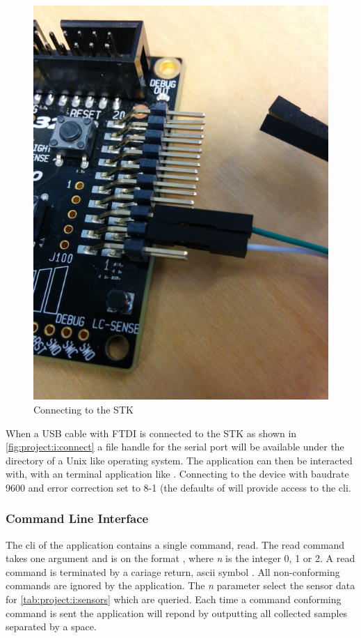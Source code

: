 \begin{figure}[H]
  \begin{center}
    \includegraphics[scale=0.5]{figures/project-i-connect.png}
  \end{center}
  \caption{Connecting to the STK}
  \label{fig:project:i:connect}
\end{figure}

When a USB cable with FTDI is connected to the STK as shown in \autoref{fig:project:i:connect} a file handle for the serial port will be available under the  directory of a Unix like operating system.
The application can then be interacted with, with an terminal application like .
Connecting to the device with baudrate 9600 and error correction set to 8-1 (the defaults of  will provide access to the {\tracker} \gls{cli}.

\subsubsection{Command Line Interface}
The \gls{cli} of the {\tracker} application contains a single command, read.
The read command takes one argument and is on the format , where \emph{n} is the integer 0, 1 or 2.
A read command is terminated by a cariage return, ascii symbol \code{\\n}.
All non-conforming commands are ignored by the application.
The \emph{n} parameter select the sensor data for \autoref{tab:project:i:sensors} which are queried.
Each time a command conforming command is sent the application will repond by outputting all collected samples separated by a space.

